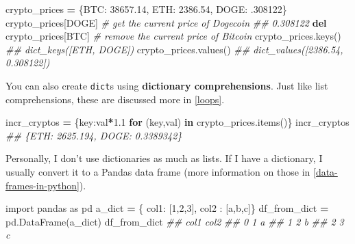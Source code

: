 \documentclass[
  12pt,
  krantz2]{krantz}
\makeatletter
\newenvironment{Shaded}{\begin{snugshade}}{\end{snugshade}}
\newcommand{\CommentTok}[1]{\textcolor[rgb]{0.37,0.37,0.37}{\textit{#1}}}
\newcommand{\ControlFlowTok}[1]{\textcolor[rgb]{0.27,0.27,0.27}{\textbf{#1}}}
\newcommand{\DecValTok}[1]{\textcolor[rgb]{0.06,0.06,0.06}{#1}}
\newcommand{\FloatTok}[1]{\textcolor[rgb]{0.06,0.06,0.06}{#1}}
\newcommand{\ImportTok}[1]{#1}
\newcommand{\KeywordTok}[1]{\textcolor[rgb]{0.27,0.27,0.27}{\textbf{#1}}}
\newcommand{\NormalTok}[1]{#1}
\newcommand{\OperatorTok}[1]{\textcolor[rgb]{0.43,0.43,0.43}{\textbf{#1}}}
\newcommand{\StringTok}[1]{\textcolor[rgb]{0.5,0.5,0.5}{#1}}
\newenvironment{kframe}{%
\medskip{}
\setlength{\fboxsep}{.8em}
 \def\at@end@of@kframe{}%
 \ifinner\ifhmode%
  \def\at@end@of@kframe{\end{minipage}}%
  \begin{minipage}{\columnwidth}%
 \fi\fi%
 \def\FrameCommand##1{\hskip\@totalleftmargin \hskip-\fboxsep
 \colorbox{shadecolor}{##1}\hskip-\fboxsep
     \hskip-\linewidth \hskip-\@totalleftmargin \hskip\columnwidth}%
 \MakeFramed {\advance\hsize-\width
   \@totalleftmargin\z@ \linewidth\hsize
   \@setminipage}}%
 {\par\unskip\endMakeFramed%
 \at@end@of@kframe}
\renewenvironment{Shaded}{\begin{kframe}}{\end{kframe}}
\makeatother
\begin{document}
\begin{Shaded}
\begin{Highlighting}[]
\NormalTok{crypto\_prices }\OperatorTok{=}\NormalTok{ \{}\StringTok{\textquotesingle{}BTC\textquotesingle{}}\NormalTok{: }\FloatTok{38657.14}\NormalTok{, }\StringTok{\textquotesingle{}ETH\textquotesingle{}}\NormalTok{: }\FloatTok{2386.54}\NormalTok{, }\StringTok{\textquotesingle{}DOGE\textquotesingle{}}\NormalTok{: }\FloatTok{.308122}\NormalTok{\}}
\NormalTok{crypto\_prices[}\StringTok{\textquotesingle{}DOGE\textquotesingle{}}\NormalTok{] }\CommentTok{\# get the current price of Dogecoin}
\CommentTok{\#\# 0.308122}
\KeywordTok{del}\NormalTok{ crypto\_prices[}\StringTok{\textquotesingle{}BTC\textquotesingle{}}\NormalTok{] }\CommentTok{\# remove the current price of Bitcoin}
\NormalTok{crypto\_prices.keys()}
\CommentTok{\#\# dict\_keys([\textquotesingle{}ETH\textquotesingle{}, \textquotesingle{}DOGE\textquotesingle{}])}
\NormalTok{crypto\_prices.values()}
\CommentTok{\#\# dict\_values([2386.54, 0.308122])}
\end{Highlighting}
\end{Shaded}

You can also create \texttt{dict}s using \textbf{dictionary comprehensions}. Just like list comprehensions, these are discussed more in \ref{loops}.

\begin{Shaded}
\begin{Highlighting}[]
\NormalTok{incr\_cryptos }\OperatorTok{=}\NormalTok{ \{key:val}\OperatorTok{*}\FloatTok{1.1} \ControlFlowTok{for}\NormalTok{ (key,val) }\KeywordTok{in}\NormalTok{ crypto\_prices.items()\}}
\NormalTok{incr\_cryptos}
\CommentTok{\#\# \{\textquotesingle{}ETH\textquotesingle{}: 2625.194, \textquotesingle{}DOGE\textquotesingle{}: 0.3389342\}}
\end{Highlighting}
\end{Shaded}

Personally, I don't use dictionaries as much as lists. If I have a dictionary, I usually convert it to a Pandas data frame (more information on those in \ref{data-frames-in-python}).

\begin{Shaded}
\begin{Highlighting}[]
\ImportTok{import}\NormalTok{ pandas }\ImportTok{as}\NormalTok{ pd}
\NormalTok{a\_dict }\OperatorTok{=}\NormalTok{ \{ }\StringTok{\textquotesingle{}col1\textquotesingle{}}\NormalTok{: [}\DecValTok{1}\NormalTok{,}\DecValTok{2}\NormalTok{,}\DecValTok{3}\NormalTok{], }\StringTok{\textquotesingle{}col2\textquotesingle{}}\NormalTok{ : [}\StringTok{\textquotesingle{}a\textquotesingle{}}\NormalTok{,}\StringTok{\textquotesingle{}b\textquotesingle{}}\NormalTok{,}\StringTok{\textquotesingle{}c\textquotesingle{}}\NormalTok{]\}}
\NormalTok{df\_from\_dict }\OperatorTok{=}\NormalTok{ pd.DataFrame(a\_dict)}
\NormalTok{df\_from\_dict}
\CommentTok{\#\#    col1 col2}
\CommentTok{\#\# 0     1    a}
\CommentTok{\#\# 1     2    b}
\CommentTok{\#\# 2     3    c}
\end{Highlighting}
\end{Shaded}
\end{document}
